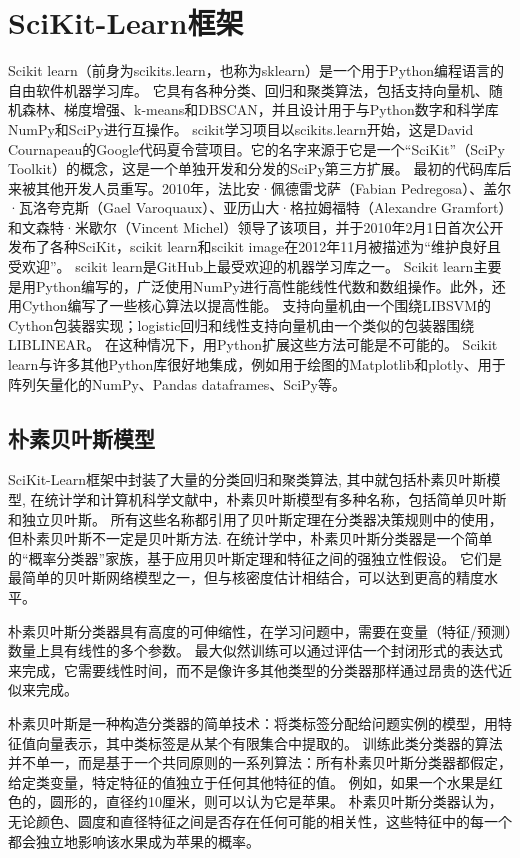 \section{SciKit-Learn框架}

Scikit learn（前身为scikits.learn，也称为sklearn）是一个用于Python编程语言的自由软件机器学习库。
它具有各种分类、回归和聚类算法，包括支持向量机、随机森林、梯度增强、k-means和DBSCAN，并且设计用于与Python数字和科学库NumPy和SciPy进行互操作。
scikit学习项目以scikits.learn开始，这是David Cournapeau的Google代码夏令营项目。它的名字来源于它是一个“SciKit”（SciPy Toolkit）的概念，这是一个单独开发和分发的SciPy第三方扩展。
最初的代码库后来被其他开发人员重写。2010年，法比安·佩德雷戈萨（Fabian Pedregosa）、盖尔·瓦洛夸克斯（Gael Varoquaux）、亚历山大·格拉姆福特（Alexandre Gramfort）和文森特·米歇尔（Vincent Michel）领导了该项目，并于2010年2月1日首次公开发布了各种SciKit，scikit learn和scikit image在2012年11月被描述为“维护良好且受欢迎”。
scikit learn是GitHub上最受欢迎的机器学习库之一。
Scikit learn主要是用Python编写的，广泛使用NumPy进行高性能线性代数和数组操作。此外，还用Cython编写了一些核心算法以提高性能。
支持向量机由一个围绕LIBSVM的Cython包装器实现；logistic回归和线性支持向量机由一个类似的包装器围绕LIBLINEAR。
在这种情况下，用Python扩展这些方法可能是不可能的。
Scikit learn与许多其他Python库很好地集成，例如用于绘图的Matplotlib和plotly、用于阵列矢量化的NumPy、Pandas dataframes、SciPy等。

\subsection{朴素贝叶斯模型}

SciKit-Learn框架中封装了大量的分类回归和聚类算法, 其中就包括朴素贝叶斯模型, 在统计学和计算机科学文献中，朴素贝叶斯模型有多种名称，包括简单贝叶斯和独立贝叶斯。
所有这些名称都引用了贝叶斯定理在分类器决策规则中的使用，但朴素贝叶斯不一定是贝叶斯方法.
在统计学中，朴素贝叶斯分类器是一个简单的“概率分类器”家族，基于应用贝叶斯定理和特征之间的强独立性假设。
它们是最简单的贝叶斯网络模型之一，但与核密度估计相结合，可以达到更高的精度水平。

朴素贝叶斯分类器具有高度的可伸缩性，在学习问题中，需要在变量（特征/预测）数量上具有线性的多个参数。
最大似然训练可以通过评估一个封闭形式的表达式来完成，它需要线性时间，而不是像许多其他类型的分类器那样通过昂贵的迭代近似来完成。

朴素贝叶斯是一种构造分类器的简单技术：将类标签分配给问题实例的模型，用特征值向量表示，其中类标签是从某个有限集合中提取的。
训练此类分类器的算法并不单一，而是基于一个共同原则的一系列算法：所有朴素贝叶斯分类器都假定，给定类变量，特定特征的值独立于任何其他特征的值。
例如，如果一个水果是红色的，圆形的，直径约10厘米，则可以认为它是苹果。
朴素贝叶斯分类器认为，无论颜色、圆度和直径特征之间是否存在任何可能的相关性，这些特征中的每一个都会独立地影响该水果成为苹果的概率。

